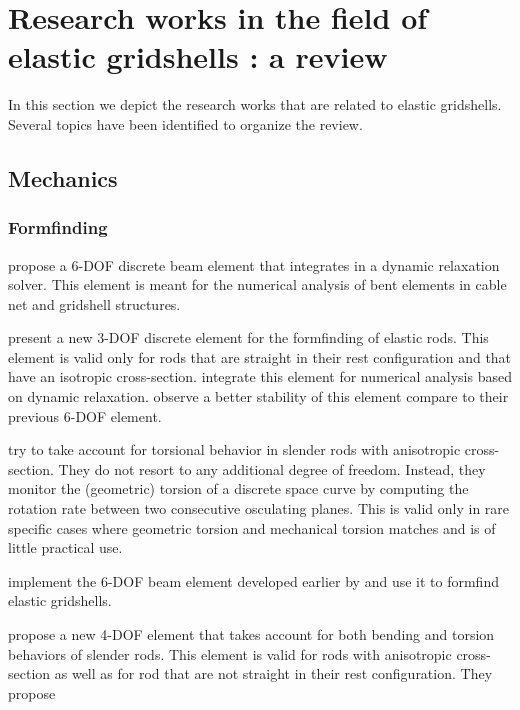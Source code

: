 \clearpage
\section{Research works in the field of elastic gridshells : a review}
In this section we depict the research works that are related to elastic gridshells. Several topics have been identified to organize the review.

\subsection{Mechanics}

\subsubsection{Formfinding}

 propose a 6-DOF discrete beam element that integrates in a dynamic relaxation solver. This element is meant for the numerical analysis of bent elements in cable net and gridshell structures.

 present a new 3-DOF discrete element for the formfinding of elastic rods. This element is valid only for rods that are straight in their rest configuration and that have an isotropic cross-section.  integrate this element for numerical analysis based on dynamic relaxation.  observe a better stability of this element compare to their previous 6-DOF element.

 try to take account for torsional behavior in slender rods with anisotropic cross-section. They do not resort to any additional degree of freedom. Instead, they monitor the (geometric) torsion of a discrete space curve by computing the rotation rate between two consecutive osculating planes. This is valid only in rare specific cases where geometric torsion and mechanical torsion matches and is of little practical use.

 implement the 6-DOF beam element developed earlier by  and use it to formfind elastic gridshells.

 propose a new 4-DOF element that takes account for both bending and torsion behaviors of slender rods. This element is valid for rods with anisotropic cross-section as well as for rod that are not straight in their rest configuration. They propose 

\cite{Barnes2013}
\cite{DAmico2014}
\cite{DAmico2016}
\cite{Poulsen2015}
\cite{Vaulot2016}


